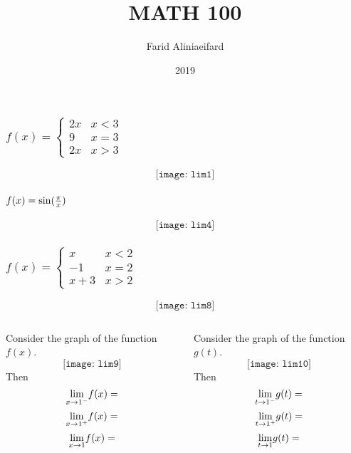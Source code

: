 \documentclass{beamer}
\title{MATH 100}
\author{Farid Aliniaeifard}
\institute{\bf University of British Columbia}
\date{2019}
\begin{document}
	
	\frame{\titlepage}
	
	
	\begin{frame}
		\frametitle{$
	f(x)=\begin{cases}
	2x & x<3\\
	9 & x=3\\
	2x & x>3
	\end{cases}
	$}
		$$
	\texttt{[image: lim1]}
	$$
\end{frame}
\begin{frame}
\frametitle{$f(x)={\rm sin}(\frac{\pi}{x})$}
	$$
\texttt{[image: lim4]}
$$
\end{frame}

\begin{frame}
\frametitle{$
	f(x)=	\begin{cases}
		x & x<2\\
		-1 & x=2\\
		x+3 & x>2
		\end{cases}
		$
	}
		$$
		\texttt{[image: lim8]}
		$$
\end{frame}
\begin{frame}
\begin{columns}
\begin{column}{0.48\textwidth}
\begin{Example} Consider the graph of the function $f(x)$.
	$$
	\texttt{[image: lim9]}
	$$
	Then 
	$$
	\underset{x\rightarrow 1^-}{\rm lim}f(x)= $$
$$	\underset{x\rightarrow 1^+}{\rm lim}f(x)=  $$ 	$$\underset{x\rightarrow 1}{\rm lim}f(x)=
	$$
\end{Example}
\end{column}


	\begin{column}{0.48\textwidth}
\begin{Example} Consider the graph of the function $g(t)$.
	$$
	\texttt{[image: lim10]}
	$$
	Then 
	$$
	\underset{t\rightarrow 1^-}{\rm lim}g(t)=$$ 
$$	\underset{t\rightarrow 1^+}{\rm lim}g(t)= $$ 
$$	\underset{t\rightarrow 1}{\rm lim}g(t)=
	$$
\end{Example}
\end{column}
\end{columns}
\end{frame}
\end{document}
